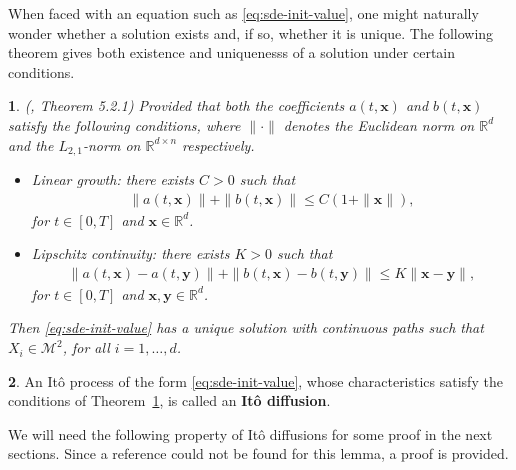 \documentclass[english]{article}
\numberwithin{equation}{section}
\numberwithin{figure}{section}
\theoremstyle{bolddescit}
\newtheorem{theorem}{\protect\theoremname}[section]
\theoremstyle{definition}
\newtheorem{definition}[theorem]{\protect\definitionname}
\theoremstyle{definition}
\theoremstyle{plain}
\theoremstyle{plain}
\theoremstyle{bolddesc}
\theoremstyle{plain}
\theoremstyle{remark}
\providecommand{\definitionname}{Definition}
\providecommand{\theoremname}{Theorem}
\begin{document}
When faced with an equation such as \eqref{eq:sde-init-value}, one might naturally wonder whether a solution exists and, if so, whether it is unique. The following theorem gives both existence and uniquenesss of a solution under certain conditions.

\begin{theorem}\label{thm:sde-solution}
  (\cite{oksendal_stochastic_2003}, Theorem 5.2.1)
  Provided that both the coefficients $a(t,\mathbf{x})$ and $b(t,\mathbf{x})$ satisfy the following conditions, where $\|\cdot\|$ denotes the Euclidean norm on $\mathbb{R}^d$ and the $L_{2,1}$-norm on $\mathbb{R}^{d \times n}$ respectively.
  \begin{itemize}
    \item Linear growth: there exists $C > 0$ such that
      \begin{align*}
        \|a(t,\mathbf{x})\| + \|b(t,\mathbf{x})\| \le C (1 + \|\mathbf{x}\|),
      \end{align*}
      for $t \in [0,T]$ and $\mathbf{x} \in \mathbb{R}^d$.
    \item Lipschitz continuity: there exists $K > 0$ such that
      \begin{align*}
        \|a(t,\mathbf{x}) - a(t,\mathbf{y})\| + \|b(t,\mathbf{x}) - b(t,\mathbf{y})\| \le K \|\mathbf{x}-\mathbf{y}\|,
      \end{align*}
      for $t \in [0,T]$ and $\mathbf{x},\mathbf{y} \in \mathbb{R}^d$.
  \end{itemize}
  Then \eqref{eq:sde-init-value} has a unique solution with continuous paths such that $X_i \in \mathcal{M}^2$, for all $i=1,\ldots,d$.
\end{theorem}

\begin{definition}\label{def:ito-diffusion}
  An It\^o process of the form \eqref{eq:sde-init-value}, whose characteristics satisfy the conditions of Theorem~\ref{thm:sde-solution}, is called an \textbf{It\^o diffusion}.
\end{definition}

We will need the following property of It\^o diffusions for some proof in the next sections. Since a reference could not be found for this lemma, a proof is provided.
\end{document}
